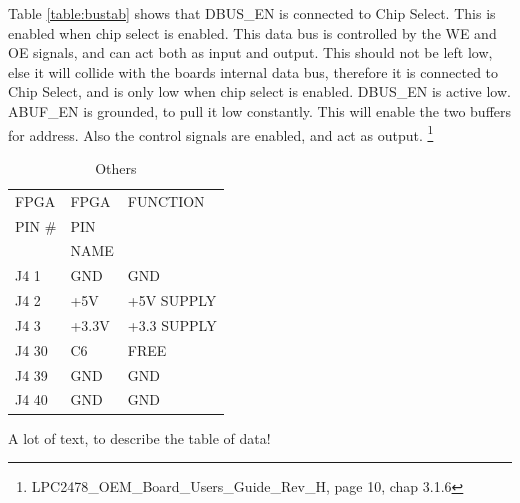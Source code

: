 Table \ref{table:bustab} shows that DBUS\_EN is connected to Chip Select. This is enabled when chip select is enabled. This data bus is controlled by the WE and OE signals, and can act both as input and output. This should not be left low, else it will collide with the boards internal data bus, therefore it is connected to Chip Select, and is only low when chip select is enabled. DBUS\_EN is active low. \\
ABUF\_EN is grounded, to pull it low constantly. This will enable the two buffers for address. Also the control signals are enabled, and act as output. \footnote{LPC2478\_OEM\_Board\_Users\_Guide\_Rev\_H, page 10, chap 3.1.6}


\begin{table}[H]
\begin{center}
\caption{Others}
\begin{tabular}{|l|l||l|}
\hline FPGA & FPGA & FUNCTION \\ 
PIN \# & PIN & \\
 & NAME & \\
\hline J4 1 & GND & GND \\ 
\hline J4 2 & +5V & +5V SUPPLY \\ 
\hline J4 3 & +3.3V & +3.3 SUPPLY \\ 
\hline J4 30 & C6 & FREE \\ 
\hline J4 39 & GND & GND \\ 
\hline J4 40 & GND & GND \\ 
\hline 
\end{tabular} 
\label{table:otherstab} %
\end{center}
\end{table}
A lot of text, to describe the table of data!

